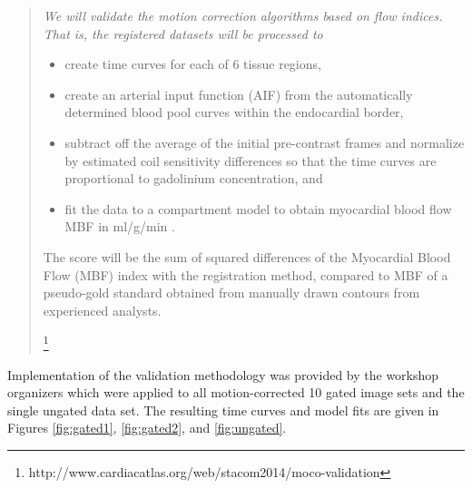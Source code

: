 \documentclass{llncs}
\begin{document}
\begin{quote}
{\it
We will validate the motion correction algorithms based on flow indices. 
That is, the registered datasets will be processed to
\begin{itemize}
\item create time curves for each of 6 tissue regions,
\item create an arterial input function (AIF) from the automatically determined 
blood pool curves within the endocardial border,
\item subtract off the average of the initial pre-contrast frames and 
normalize by estimated coil sensitivity differences so that the time curves 
are proportional to gadolinium concentration, and
\item fit the data to a compartment model to obtain myocardial blood flow MBF in 
ml/g/min  \cite{pack2010}.
\end{itemize}
The score will be the sum of squared differences of the Myocardial Blood 
Flow (MBF) index with the registration method, compared to MBF of a 
pseudo-gold standard obtained from manually drawn contours from experienced 
analysts.}%
\footnote{
http://www.cardiacatlas.org/web/stacom2014/moco-validation
}
\end{quote}
Implementation of the validation methodology was provided by the workshop 
organizers which were applied to all motion-corrected 10 gated image sets and the 
single ungated data set.  The resulting time curves and model fits are
given in Figures \ref{fig:gated1}, \ref{fig:gated2}, and \ref{fig:ungated}.
\end{document}
